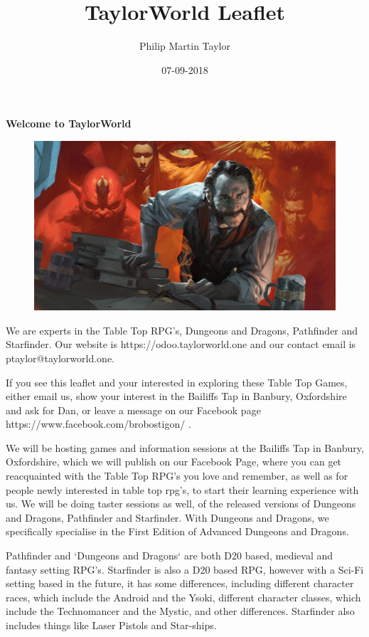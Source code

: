 \documentclass[12pt]{extreport}
\date{07-09-2018}
\author{Philip Martin Taylor}
\title{TaylorWorld Leaflet}
\begin{document}
 
\begin{center} 
\textbf{Welcome to TaylorWorld\texttrademark} 
\end{center} 
\begin{figure}[h]
  \centering
  \includegraphics[scale=0.15]{alchemist.jpg}
\end{figure}
\begin{flushleft} We are experts in the Table Top RPG's, Dungeons and Dragons, Pathfinder and Starfinder. Our website is https://odoo.taylorworld.one and our contact email is ptaylor@taylorworld.one. 
\end{flushleft} 
\begin{flushleft}
  If you see this leaflet and your interested in exploring these Table Top Games, either email us, show your interest in the Bailiffs Tap in Banbury, Oxfordshire and ask for Dan, or leave a message on our Facebook page https://www.facebook.com/brobostigon/ . 
\end{flushleft} 
\begin{flushleft}
 We will be hosting games and information sessions at the Bailiffs Tap in Banbury, Oxfordshire, which we will publish on our Facebook Page, where you can get reacquainted with the Table Top RPG's you love and remember, as well as for people newly interested in table top rpg's, to start their learning experience with us. We will be doing taster sessions as well, of the released versions of Dungeons and Dragons, Pathfinder and Starfinder. With Dungeons and Dragons, we specifically specialise in the First Edition of Advanced Dungeons and Dragons.
\end{flushleft} 
\begin{flushleft}
  Pathfinder and `Dungeons and Dragons` are both D20 based, medieval and fantasy setting RPG's. Starfinder is also a D20 based RPG, however with a Sci-Fi setting based in the future, it has some differences, including different character races, which include the Android and the Ysoki, different character classes, which include the Technomancer and the Mystic, and other differences. Starfinder also includes things like Laser Pistols and Star-ships. 
\end{flushleft} 
\end{document}
